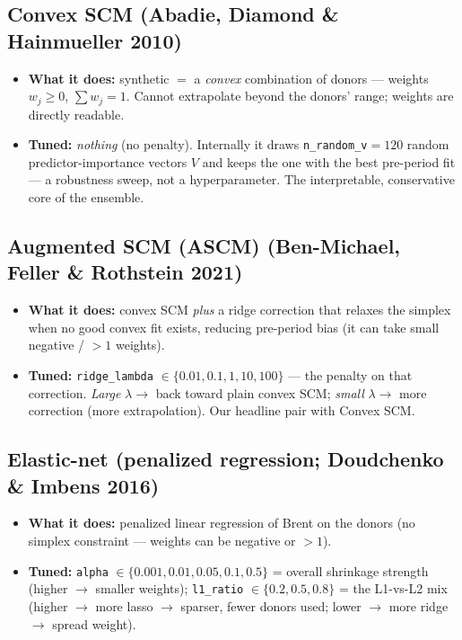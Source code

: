 \documentclass[11pt,a4paper]{article}
\newcommand{\highlight}[1]{\textcolor{accent}{\textbf{#1}}}
\newcommand{\src}[1]{{\normalfont\small\textcolor{muted}{(#1)}}}
\begin{document}
\subsection{Convex SCM \src{Abadie, Diamond \& Hainmueller 2010}}
\begin{itemize}
  \item \highlight{What it does:} synthetic $=$ a \emph{convex} combination of donors --- weights
    $w_j \ge 0$, $\sum w_j = 1$. Cannot extrapolate beyond the donors' range; weights are directly readable.
  \item \highlight{Tuned:} \emph{nothing} (no penalty). Internally it draws \texttt{n\_random\_v}$=120$
    random predictor-importance vectors $V$ and keeps the one with the best pre-period fit --- a robustness
    sweep, not a hyperparameter. The interpretable, conservative core of the ensemble.
\end{itemize}

\subsection{Augmented SCM (ASCM) \src{Ben-Michael, Feller \& Rothstein 2021}}
\begin{itemize}
  \item \highlight{What it does:} convex SCM \emph{plus} a ridge correction that relaxes the simplex when
    no good convex fit exists, reducing pre-period bias (it can take small negative / $>1$ weights).
  \item \highlight{Tuned:} \texttt{ridge\_lambda} $\in\{0.01,0.1,1,10,100\}$ --- the penalty on that
    correction. \emph{Large} $\lambda \to$ back toward plain convex SCM; \emph{small} $\lambda \to$ more
    correction (more extrapolation). Our headline pair with Convex SCM.
\end{itemize}

\subsection{Elastic-net \src{penalized regression; Doudchenko \& Imbens 2016}}
\begin{itemize}
  \item \highlight{What it does:} penalized linear regression of Brent on the donors (no simplex
    constraint --- weights can be negative or $>1$).
  \item \highlight{Tuned:} \texttt{alpha} $\in\{0.001,0.01,0.05,0.1,0.5\}$ = overall shrinkage strength
    (higher $\to$ smaller weights); \texttt{l1\_ratio} $\in\{0.2,0.5,0.8\}$ = the L1-vs-L2 mix (higher
    $\to$ more lasso $\to$ sparser, fewer donors used; lower $\to$ more ridge $\to$ spread weight).
\end{itemize}
\end{document}
